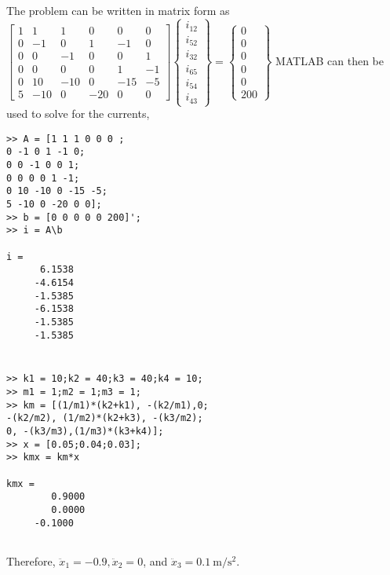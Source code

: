 \documentclass[../main.tex]{subfiles}
\begin{document}
\begin{enumerate}[label=\bfseries(\alph*)]
\section{}
\bigbreak
The problem can be written in matrix form as
\bigbreak
$\left[\begin{array}{cccccc}1 & 1 & 1 & 0 & 0 & 0 \\ 0 & -1 & 0 & 1 & -1 & 0 \\ 0 & 0 & -1 & 0 & 0 & 1 \\ 0 & 0 & 0 & 0 & 1 & -1 \\ 0 & 10 & -10 & 0 & -15 & -5 \\ 5 & -10 & 0 & -20 & 0 & 0\end{array}\right]\left\{\begin{array}{l}i_{12} \\ i_{52} \\ i_{32} \\ i_{65} \\ i_{54} \\ i_{43}\end{array}\right\}=\left\{\begin{array}{c}0 \\ 0 \\ 0 \\ 0 \\ 0 \\ 200\end{array}\right\}$
\bigbreak
MATLAB can then be used to solve for the currents,
\bigbreak
\begin{lstlisting}[numbers=none]
>> A = [1 1 1 0 0 0 ;
0 -1 0 1 -1 0;
0 0 -1 0 0 1;
0 0 0 0 1 -1;
0 10 -10 0 -15 -5;
5 -10 0 -20 0 0];
>> b = [0 0 0 0 0 200]';
>> i = A\b

i =
 	  6.1538
	 -4.6154
 	 -1.5385
 	 -6.1538
 	 -1.5385
 	 -1.5385
\end{lstlisting}
\bigbreak

\section{}
\begin{lstlisting}[numbers=none]
 >> k1 = 10;k2 = 40;k3 = 40;k4 = 10;
>> m1 = 1;m2 = 1;m3 = 1;
>> km = [(1/m1)*(k2+k1), -(k2/m1),0;
-(k2/m2), (1/m2)*(k2+k3), -(k3/m2);
0, -(k3/m3),(1/m3)*(k3+k4)];
>> x = [0.05;0.04;0.03];
>> kmx = km*x

kmx =
 		0.9000
		0.0000
 	 -0.1000
 
\end{lstlisting}
\bigbreak
Therefore, $\ddot{x}_{1}=-0.9, \ddot{x}_{2}=0$, and $\ddot{x}_{3}=0.1 \mathrm{~m} / \mathrm{s}^{2}$.

 
 
\end{enumerate}
\end{document}
